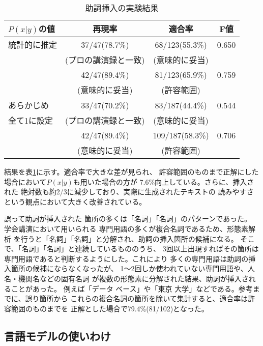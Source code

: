 \begin{table}[t]
\footnotesize
\begin{center}
\caption{助詞挿入の実験結果}
 \begin{tabular}{|l||c|c|c|}
\hline
 $P(x|y)$の値		&再現率			&適合率			&F値		\\\hline\hline
 統計的に推定		& 37/47(78.7\%)		& 68/123(55.3\%)	&0.650		\\
 			& (プロの講演録と一致)	& (意味的に妥当)	&		\\
  			& 42/47(89.4\%)		& 81/123(65.9\%) 	&0.759		\\
			& (意味的に妥当)	& (許容範囲)		&		\\\hline
 あらかじめ		& 33/47(70.2\%)		& 83/187(44.4\%)	&0.544		\\
 全て1に設定		& (プロの講演録と一致)	& (意味的に妥当)	&		\\
 			& 42/47(89.4\%)		& 109/187(58.3\%)	&0.706		\\
			& (意味的に妥当)	& (許容範囲)		&		\\\hline
 \end{tabular}
 \label{joshikekka}
\end{center}
\vspace{-7.0mm}
\end{table}

結果を表\ref{joshikekka}に示す。適合率で大きな差が見られ、
許容範囲のものまで正解にした場合において$P(x|y)$も用いた場合の方が
7.6\%向上している。さらに、挿入された
絶対数も約2/3に減少しており、実際に生成されたテキストの
読みやすさという観点において大きく改善されている。

誤って助詞が挿入された
箇所の多くは「名詞」「名詞」のパターンであった。
学会講演において用いられる
専門用語の多くが複合名詞であるため、形態素解析
を行うと「名詞」「名詞」と分解され、助詞の挿入箇所の候補になる。
そこで、「名詞」「名詞」と連続しているもののうち、
3回以上出現すればその箇所は専門用語であると判断するようにした。これにより
多くの専門用語は助詞の挿入箇所の候補にならなくなったが、
1〜2回しか使われていない専門用語や、人名・機関名などの固有名詞
が複数の形態素に分解された結果、助詞が挿入されることがあった。
例えば「データ ベース」や「東京 大学」などである。参考までに、誤り箇所から
これらの複合名詞の箇所を除いて集計すると、適合率は許容範囲のものまでを
正解とした場合で79.4\%(81/102)となった。

\subsection{言語モデルの使いわけ}

